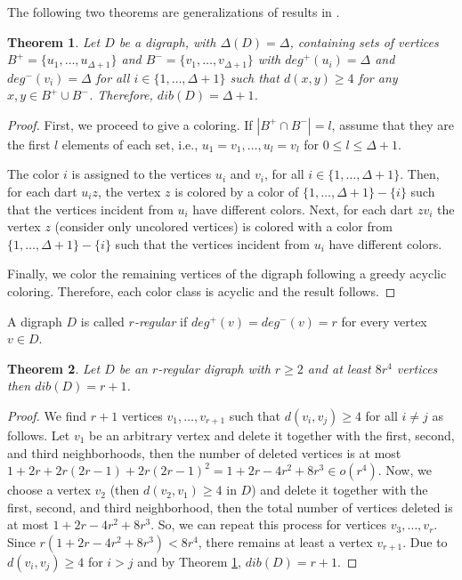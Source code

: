 \documentclass[12pt]{article}
\newtheorem{theorem}{Theorem}
\begin{document}
The following two theorems are generalizations of results in \cite{MR2063820}.

\begin{theorem}\label{teo9}
Let $D$ be a digraph, with $\Delta(D)=\Delta$, containing sets of vertices $B^+=\{u_1,\ldots, u_{\Delta+1}\}$ and $B^-=\{v_1, \ldots, v_{\Delta+1}\}$ with $deg^{+}(u_i)=\Delta$ and $deg^{-}(v_i)=\Delta$ for all $i\in\{1,\ldots,\Delta+1\}$ such that $d(x, y)\geq 4$ for any $x,y\in B^+\cup B^-$. Therefore, $dib(D)= \Delta+1$.
\end{theorem}
\begin{proof}
First, we proceed to give a coloring. If $|B^+\cap B^- | = l$, assume that they are the first $l$ elements of each set, i.e., $u_1=v_1,\ldots,u_l=v_l$ for $0\leq l\leq \Delta+1$.

The color $i$ is assigned to the vertices $u_i$ and $v_i$, for all $i\in \{1,\ldots,\Delta+1\}$. Then, for each dart $u_iz$, the vertex $z$ is colored by a color of $\{1,\ldots, \Delta+1 \}-\{i\}$ such that the vertices incident from $u_i$ have different colors. Next, for each dart $zv_i$ the vertex $z$ (consider only uncolored vertices) is colored with a color from $\{1,\ldots, \Delta+1 \}-\{i\}$ such that the vertices incident from $u_i$ have different colors.

Finally, we color the remaining vertices of the digraph following a greedy acyclic coloring. Therefore, each color class is acyclic and the result follows.
\end{proof}

A digraph $D$ is called \emph{$r$-regular} if $deg^+(v)=deg^-(v)=r$ for every vertex $v\in D$.

\begin{theorem}\label{teo10}
Let $D$ be an $r$-regular digraph  with $r\geq 2$ and at least $8r^4$ vertices then $dib(D)=r+1$.
\end{theorem}

\begin{proof} We find $r+1$ vertices $v_1, \ldots, v_{r+1}$ such that $d(v_i, v_j)\geq 4$  for all $i \neq j$ as follows.
Let $v_1$ be an arbitrary vertex and delete it together with the first, second, and third neighborhoods, then the number of deleted vertices is at most $1+2r+2r(2r-1)+2r(2r-1)^2 = 1+2r-4r^2+8r^3\in o(r^4)$. Now, we choose a vertex $v_2$ (then $d(v_2, v_1)\geq 4$ in $D$) and delete it together with the first, second, and third neighborhood, then the total number of vertices deleted is at most $ 1+2r-4r^2+8r^3$. So, we can repeat this process for vertices $v_3, \ldots, v_{r}$. Since $r(1+2r-4r^2+8r^3) < 8r^4$, there remains at least a vertex $v_{r+1}$. Due to $d(v_i, v_j)\geq 4$ for $i>j$ and by Theorem \ref{teo9}, $dib(D)= r+1$.

\end{proof}
\end{document}
